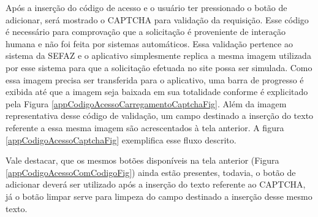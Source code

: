 \newpage
Após a inserção do código de acesso e o usuário ter pressionado o botão de adicionar, será mostrado o CAPTCHA para validação da requisição. Esse código é necessário para comprovação que a solicitação é proveniente de interação humana e não foi feita por sistemas automáticos. Essa validação pertence ao sistema da SEFAZ e o aplicativo simplesmente replica a mesma imagem utilizada por esse sistema para que a solicitação efetuada no site possa ser simulada. Como essa imagem precisa ser transferida para o aplicativo, uma barra de progresso é exibida até que a imagem seja baixada em sua totalidade conforme é explicitado pela Figura \ref{appCodigoAcessoCarregamentoCaptchaFig}. Além da imagem representativa desse código de validação, um campo destinado a inserção do texto referente a essa mesma imagem são acrescentados à tela anterior. A figura \ref{appCodigoAcessoCaptchaFig} exemplifica esse fluxo descrito.

Vale destacar, que os mesmos botões disponíveis na tela anterior (Figura \ref{appCodigoAcessoComCodigoFig}) ainda estão presentes, todavia, o botão de adicionar deverá ser utilizado após a inserção do texto referente ao CAPTCHA, já o botão limpar serve para limpeza do campo destinado a inserção desse mesmo texto.

